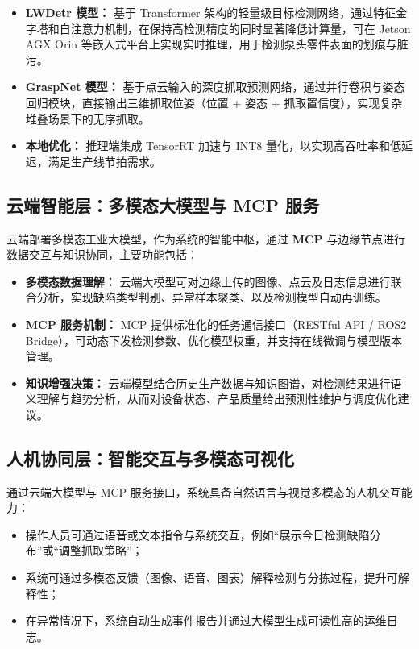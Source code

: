 \documentclass{cumcmthesis}
\begin{document}
\begin{itemize}
    \item \textbf{LWDetr 模型：}  
    基于 Transformer 架构的轻量级目标检测网络，通过特征金字塔和自注意力机制，在保持高检测精度的同时显著降低计算量，可在 Jetson AGX Orin 等嵌入式平台上实现实时推理，用于检测泵头零件表面的划痕与脏污。

    \item \textbf{GraspNet 模型：}  
    基于点云输入的深度抓取预测网络，通过并行卷积与姿态回归模块，直接输出三维抓取位姿（位置 + 姿态 + 抓取置信度），实现复杂堆叠场景下的无序抓取。

    \item \textbf{本地优化：}  
    推理端集成 TensorRT 加速与 INT8 量化，以实现高吞吐率和低延迟，满足生产线节拍需求。
\end{itemize}

\subsection{云端智能层：多模态大模型与 MCP 服务}

云端部署多模态工业大模型，作为系统的智能中枢，通过 \textbf{MCP} 与边缘节点进行数据交互与知识协同，主要功能包括：

\begin{itemize}
    \item \textbf{多模态数据理解：}  
    云端大模型可对边缘上传的图像、点云及日志信息进行联合分析，实现缺陷类型判别、异常样本聚类、以及检测模型自动再训练。

    \item \textbf{MCP 服务机制：}  
    MCP 提供标准化的任务通信接口（RESTful API / ROS2 Bridge），可动态下发检测参数、优化模型权重，并支持在线微调与模型版本管理。

    \item \textbf{知识增强决策：}  
    云端模型结合历史生产数据与知识图谱，对检测结果进行语义理解与趋势分析，从而对设备状态、产品质量给出预测性维护与调度优化建议。
\end{itemize}

\subsection{人机协同层：智能交互与多模态可视化}

通过云端大模型与 MCP 服务接口，系统具备自然语言与视觉多模态的人机交互能力：

\begin{itemize}
    \item 操作人员可通过语音或文本指令与系统交互，例如“展示今日检测缺陷分布”或“调整抓取策略”；
    \item 系统可通过多模态反馈（图像、语音、图表）解释检测与分拣过程，提升可解释性；
    \item 在异常情况下，系统自动生成事件报告并通过大模型生成可读性高的运维日志。
\end{itemize}
\end{document}
